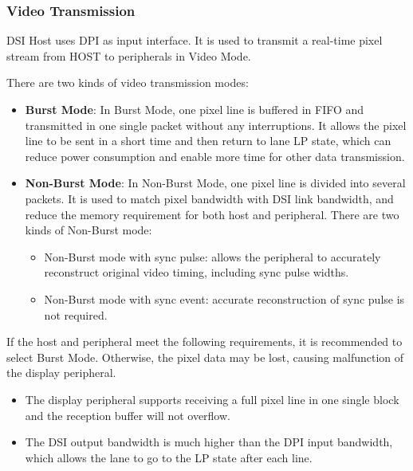 \documentclass[main\_\_EN.tex]{subfiles}
\begin{document}
\subsubsection{Video Transmission}
DSI Host uses DPI as input interface. It is used to transmit a real-time pixel stream from HOST to peripherals in Video Mode.

There are two kinds of video transmission modes:

\begin{itemize}
    \item \textbf{Burst Mode}: In Burst Mode, one pixel line is buffered in FIFO and transmitted in one single packet without any interruptions. It allows the pixel line to be sent in a short time and then return to lane LP state, which can reduce power consumption and enable more time for other data transmission.
    \item \textbf{Non-Burst Mode}: In Non-Burst Mode, one pixel line is divided into several packets. It is used to match pixel bandwidth with DSI link bandwidth, and reduce the memory requirement for both host and peripheral. There are two kinds of Non-Burst mode:
    \begin{itemize}
        \item Non-Burst mode with sync pulse: allows the peripheral to accurately reconstruct original video timing, including sync pulse widths.
        \item Non-Burst mode with sync event: accurate reconstruction of sync pulse is not required.
    \end{itemize}
\end{itemize}

If the host and peripheral meet the following requirements, it is recommended to select Burst Mode. Otherwise, the pixel data may be lost, causing malfunction of the display peripheral.
\begin{itemize}
    \item The display peripheral supports receiving a full pixel line in one single block and the reception buffer will not overflow.
    \item The DSI output bandwidth is much higher than the DPI input bandwidth, which allows the lane to go to the LP state after each line.
\end{itemize}
\end{document}
